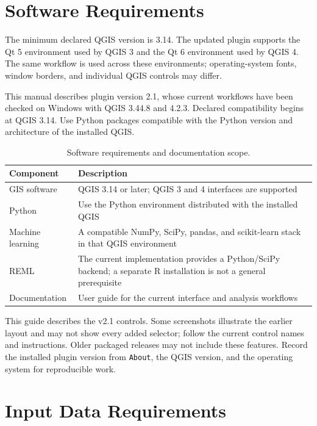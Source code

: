 \documentclass[11pt,a4paper]{article}
\newcommand{\minimumqgisversion}{3.14}
\begin{document}
\section{Software Requirements}

The minimum declared QGIS version is \minimumqgisversion{}. The updated plugin supports the Qt 5 environment used by QGIS 3 and the Qt 6 environment used by QGIS 4. The same workflow is used across these environments; operating-system fonts, window borders, and individual QGIS controls may differ.

This manual describes plugin version 2.1, whose current workflows have been checked on Windows with QGIS 3.44.8 and 4.2.3. Declared compatibility begins at QGIS 3.14. Use Python packages compatible with the Python version and architecture of the installed QGIS.

\begin{table}[H]
\centering
\caption{Software requirements and documentation scope.}
\begin{tabularx}{0.96\textwidth}{P{4.5cm}Y}
\toprule
\textbf{Component} & \textbf{Description} \\
\midrule
GIS software & QGIS 3.14 or later; QGIS 3 and 4 interfaces are supported \\
Python & Use the Python environment distributed with the installed QGIS \\
Machine learning & A compatible NumPy, SciPy, pandas, and scikit-learn stack in that QGIS environment \\
REML & The current implementation provides a Python/SciPy backend; a separate R installation is not a general prerequisite \\
Documentation & User guide for the current interface and analysis workflows \\
\bottomrule
\end{tabularx}
\end{table}

\begin{infobox}
This guide describes the v2.1 controls. Some screenshots illustrate the earlier layout and may not show every added selector; follow the current control names and instructions. Older packaged releases may not include these features. Record the installed plugin version from \texttt{About}, the QGIS version, and the operating system for reproducible work.
\end{infobox}

\section{Input Data Requirements}
\end{document}
